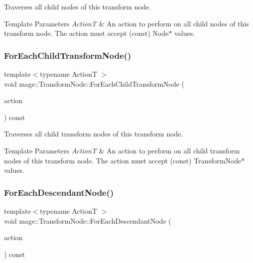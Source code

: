 Traverses all child nodes of this transform node.


\begin{DoxyTemplParams}{Template Parameters}
{\em ActionT} & An action to perform on all child nodes of this transform node. The action must accept ({\ttfamily const}) {\ttfamily Node$\ast$} values. \\
\hline
\end{DoxyTemplParams}
\hypertarget{structmage_1_1_transform_node_ad9c166b58e3718125d2a51827f8d7ca2}{}\label{structmage_1_1_transform_node_ad9c166b58e3718125d2a51827f8d7ca2} 
\subsubsection{\texorpdfstring{For\+Each\+Child\+Transform\+Node()}{ForEachChildTransformNode()}}
{\footnotesize\ttfamily template$<$typename ActionT $>$ \\
void mage\+::\+Transform\+Node\+::\+For\+Each\+Child\+Transform\+Node (\begin{DoxyParamCaption}\item[{ActionT}]{action }\end{DoxyParamCaption}) const\hspace{0.3cm}{\ttfamily [private]}}

Traverses all child transform nodes of this transform node.


\begin{DoxyTemplParams}{Template Parameters}
{\em ActionT} & An action to perform on all child transform nodes of this transform node. The action must accept ({\ttfamily const}) {\ttfamily Transform\+Node$\ast$} values. \\
\hline
\end{DoxyTemplParams}
\hypertarget{structmage_1_1_transform_node_a696d23bd936d3c3f880cb8b5cfd54d80}{}\label{structmage_1_1_transform_node_a696d23bd936d3c3f880cb8b5cfd54d80} 
\subsubsection{\texorpdfstring{For\+Each\+Descendant\+Node()}{ForEachDescendantNode()}}
{\footnotesize\ttfamily template$<$typename ActionT $>$ \\
void mage\+::\+Transform\+Node\+::\+For\+Each\+Descendant\+Node (\begin{DoxyParamCaption}\item[{ActionT}]{action }\end{DoxyParamCaption}) const\hspace{0.3cm}{\ttfamily [private]}}


